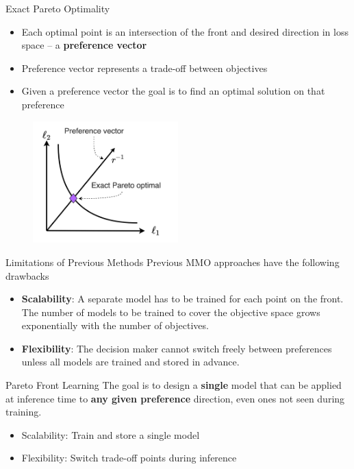\documentclass[13pt]{beamer}				\usepackage{graphicx}
\begin{document}
\begin{frame}{Exact Pareto Optimality}
\begin{itemize}
\item Each optimal point is an intersection of the front and desired direction in loss space -- a \textbf{preference vector}
\item Preference vector represents a trade-off between objectives
\item Given a preference vector the goal is to find an optimal solution on that preference
\end{itemize}
\begin{figure}[h!]
    \includegraphics[width=0.5\textwidth, trim={0 0 0 0cm},clip]{images/exact_pareto.png}
\end{figure}
\end{frame}

\begin{frame}{Limitations of Previous Methods}
Previous MMO approaches have the following drawbacks
\vspace{5pt}
\begin{itemize}
\item \textbf{Scalability}: A separate model has to be trained for each point on the front. The number of models to be trained to cover the objective space grows exponentially with the number of objectives.
\item \textbf{Flexibility}: The decision maker cannot switch freely between preferences unless all models are trained and stored in advance.
\end{itemize}
\end{frame}

\begin{frame}{Pareto Front Learning}
The goal is to design a \textbf{single} model that can be applied at inference time to \textbf{any given preference} direction, even ones not seen during training.
\vspace{5pt}
\begin{itemize}
\item Scalability: Train and store a single model
\item Flexibility: Switch trade-off points during inference
\end{itemize}
\end{frame}
\end{document}
